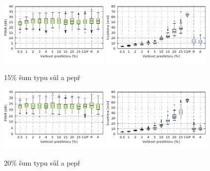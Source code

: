 
\begin{figure}[H]
    \centering
    \includegraphics[width=0.475\textwidth]{fig/plot/compare/saltpepper15-100kg-psnrtest.pdf}
    \hskip0.5cm
    \includegraphics[width=0.475\textwidth]{fig/plot/compare/saltpepper15-100kg-usertime.pdf}
    \caption{15\% šum typu sůl a pepř}
\end{figure}

\begin{figure}[H]
    \centering
    \includegraphics[width=0.475\textwidth]{fig/plot/compare/saltpepper20-100kg-psnrtest.pdf}
    \hskip0.5cm
    \includegraphics[width=0.475\textwidth]{fig/plot/compare/saltpepper20-100kg-usertime.pdf}
    \caption{20\% šum typu sůl a pepř}
\end{figure}

